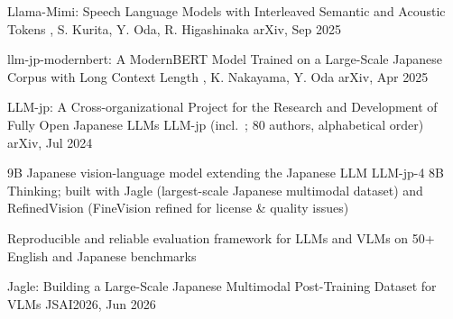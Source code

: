 \documentclass[10pt, a4paper]{article}
\begin{document}
\cvpub
  {Llama-Mimi: Speech Language Models with Interleaved Semantic and Acoustic Tokens}
  {, S. Kurita, Y. Oda, R. Higashinaka}
  {arXiv, Sep 2025}
  {
   }

\cvpub
  {llm-jp-modernbert: A ModernBERT Model Trained on a Large-Scale Japanese Corpus with Long Context Length}
  {, K. Nakayama, Y. Oda}
  {arXiv, Apr 2025}
  {
   }

\cvpub
  {LLM-jp: A Cross-organizational Project for the Research and Development of Fully Open Japanese LLMs}
  {LLM-jp (incl.\ ; 80 authors, alphabetical order)}
  {arXiv, Jul 2024}
  {}


%
  {
   }%
{9B Japanese vision-language model extending the Japanese LLM LLM-jp-4 8B Thinking; built with Jagle (largest-scale Japanese multimodal dataset) and RefinedVision (FineVision refined for license \& quality issues)}

%
  {
   }%
{Reproducible and reliable evaluation framework for LLMs and VLMs on 50+ English and Japanese benchmarks}


%
  {Jagle: Building a Large-Scale Japanese Multimodal Post-Training Dataset for VLMs}%
  {JSAI2026, Jun 2026}
\end{document}
